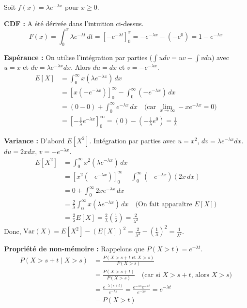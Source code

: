 \begin{proofbox}
Soit $f(x) = \lambda e^{-\lambda x}$ pour $x \ge 0$.

\textbf{CDF :} A été dérivée dans l'intuition ci-dessus.
$$ F(x) = \int_0^x \lambda e^{-\lambda t} \, dt = [ -e^{-\lambda t} ]_0^x = -e^{-\lambda x} - (-e^0) = 1 - e^{-\lambda x} $$

\textbf{Espérance :} On utilise l'intégration par parties ($\int u dv = uv - \int v du$) avec $u=x$ et $dv=\lambda e^{-\lambda x}dx$. Alors $du=dx$ et $v=-e^{-\lambda x}$.
\begin{align*}
E[X] &= \int_0^\infty x (\lambda e^{-\lambda x}) \, dx \\
&= \left[ x (-e^{-\lambda x}) \right]_0^\infty - \int_0^\infty (-e^{-\lambda x}) \, dx \\
&= (0 - 0) + \int_0^\infty e^{-\lambda x} \, dx \quad \text{(car } \lim_{x\to\infty} -xe^{-\lambda x} = 0 \text{)} \\
&= \left[ -\frac{1}{\lambda} e^{-\lambda x} \right]_0^\infty = (0) - (-\frac{1}{\lambda} e^0) = \frac{1}{\lambda}
\end{align*}

\textbf{Variance :} D'abord $E[X^2]$. Intégration par parties avec $u=x^2$, $dv=\lambda e^{-\lambda x}dx$. $du=2xdx$, $v=-e^{-\lambda x}$.
\begin{align*}
E[X^2] &= \int_0^\infty x^2 (\lambda e^{-\lambda x}) \, dx \\
&= \left[ x^2 (-e^{-\lambda x}) \right]_0^\infty - \int_0^\infty (-e^{-\lambda x}) (2x \, dx) \\
&= 0 + \int_0^\infty 2x e^{-\lambda x} \, dx \\
&= \frac{2}{\lambda} \int_0^\infty x (\lambda e^{-\lambda x}) \, dx \quad \text{(On fait apparaître } E[X] \text{)} \\
&= \frac{2}{\lambda} E[X] = \frac{2}{\lambda} \left( \frac{1}{\lambda} \right) = \frac{2}{\lambda^2}
\end{align*}
Donc, $\text{Var}(X) = E[X^2] - (E[X])^2 = \frac{2}{\lambda^2} - \left(\frac{1}{\lambda}\right)^2 = \frac{1}{\lambda^2}$.

\textbf{Propriété de non-mémoire :}
Rappelons que $P(X>t) = e^{-\lambda t}$.
\begin{align*}
P(X > s+t \mid X > s) &= \frac{P(X > s+t \text{ et } X > s)}{P(X > s)} \\
&= \frac{P(X > s+t)}{P(X > s)} \quad \text{(car si } X>s+t \text{, alors } X>s \text{)} \\
&= \frac{e^{-\lambda(s+t)}}{e^{-\lambda s}} = \frac{e^{-\lambda s} e^{-\lambda t}}{e^{-\lambda s}} = e^{-\lambda t} \\
&= P(X > t)
\end{align*}
\end{proofbox}


